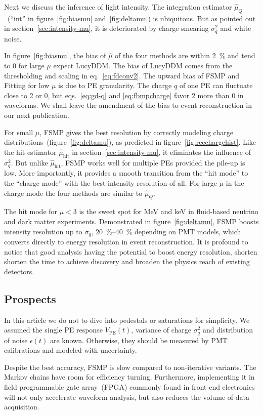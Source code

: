 Next we discuss the inference of light intensity.  The integration estimator $\hat{\mu}_Q$~(``int'' in figure~\ref{fig:biasmu} and~\ref{fig:deltamu}) is ubiquitous.  But as pointed out in section~\ref{sec:intensity-mu}, it is deteriorated by charge smearing $\sigma_q^2$ and white noise.

In figure~\ref{fig:biasmu}, the bias of $\hat{\mu}$ of the four methods are within \SI{2}{\percent} and tend to 0 for large $\mu$ expect LucyDDM.  The bias of LucyDDM comes from the thresholding and scaling in eq.~\eqref{eq:fdconv2}.  The upward bias of FSMP and Fitting for low $\mu$ is due to PE granularity.  The charge $q$ of one PE can fluctuate close to 2 or 0, but eqs.~\eqref{eq:gd-q} and \eqref{eq:fbmpcharge} favor 2 more than 0 in waveforms.  We shall leave the amendment of the bias to event reconstruction in our next publication.

For small $\mu$, FSMP gives the best resolution by correctly modeling charge distributions~(figure~\ref{fig:deltamu}), as predicted in figure~\ref{fig:recchargehist}.  Like the hit estimator $\hat{\mu}_\mathrm{hit}$ in section~\ref{sec:intensity-mu}, it eliminates the influence of $\sigma_q^2$. But unlike $\hat{\mu}_\mathrm{hit}$, FSMP works well for multiple PEs provided the pile-up is low.  More importantly, it provides a smooth transition from the ``hit mode'' to the ``charge mode'' with the best intensity resolution of all.  For large $\mu$ in the charge mode the four methods are similar to $\hat{\mu}_Q$.

The hit mode for $\mu < 3$ is the sweet spot for \si{MeV} and \si{keV} in fluid-based neutrino and dark matter experiments.  Demonstrated in figure~\ref{fig:deltamu}, FSMP boosts intensity resolution up to $\sigma_q$, \SIrange{20}{40}{\percent} depending on PMT models, which converts directly to energy resolution in event reconstruction.  It is profound to notice that good analysis having the potential to boost energy resolution, shorten shorten the time to achieve discovery and broaden the physics reach of existing detectors. 


\subsection{Prospects}
\label{sec:prospects}

In this article we do not to dive into pedestals or saturations for simplicity.  We assumed the single PE response $V_\mathrm{PE}(t)$, variance of charge $\sigma_q^2$ and distribution of noise $\epsilon(t)$ are known.  Otherwise, they should be measured by PMT calibrations and modeled with uncertainty.

Despite the best accuracy, FSMP is slow compared to non-iterative variants.  The Markov chains have room for efficiency turning.  Furthermore, implementing it in field programmable gate array~(FPGA) commonly found in front-end electronics will not only accelerate waveform analysis, but also reduces the volume of data acquisition.

